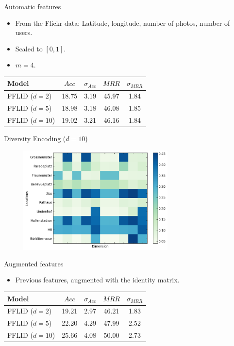 \documentclass{beamer}
\begin{document}
  \begin{frame}{Automatic features}
    \begin{itemize}
      \item From the Flickr data: Latitude, longitude, number of photos, number of users.
      \item Scaled to $[0,1]$.
      \item $m = 4$.
    \end{itemize}
    \begin{table}
      \begin{tabularx}{0.7\textwidth}{X|c|c|c|c}
        Model          & $Acc$ & $\sigma_{Acc}$ & $MRR$ & $\sigma_{MRR}$ \\
        \hline
        FFLID ($d=2$)  & 18.75 & 3.19 & 45.97 & 1.84 \\
        FFLID ($d=5$)  & 18.98 & 3.18 & 46.08 & 1.85 \\
        FFLID ($d=10$) & 19.02 & 3.21 & 46.16 & 1.84
      \end{tabularx}
    \end{table}
  \end{frame}
  
    \begin{frame}{Diversity Encoding ($d=10$)}
      \begin{figure}
        \includegraphics[width=0.7\textwidth]{submodular_weights_f_1_d_10}
      \end{figure}
    \end{frame}
  
  \begin{frame}{Augmented features}
    \begin{itemize}
      \item Previous features, augmented with the identity matrix.
    \end{itemize}
    \begin{table}
      \begin{tabularx}{0.7\textwidth}{X|c|c|c|c}
        Model          & $Acc$ & $\sigma_{Acc}$ & $MRR$ & $\sigma_{MRR}$ \\
        \hline
        FFLID ($d=2$)  & 19.21 & 2.97 & 46.21 & 1.83 \\
        FFLID ($d=5$)  & 22.20 & 4.29 & 47.99 & 2.52 \\
        FFLID ($d=10$) & 25.66 & 4.08 & 50.00 & 2.73
      \end{tabularx}
    \end{table}
  \end{frame}
  
\end{document}
